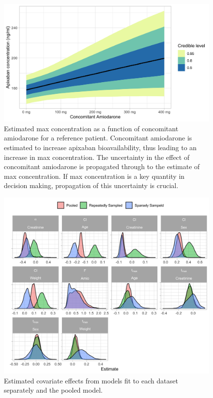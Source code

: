 \begin{figure}
	
	{\centering \includegraphics[width=\linewidth]{figures/max-concentration-1} 
		
	}
	
	\caption{Estimated max concentration as a function of concomitant amiodarone for a reference patient.  Concomitant amiodarone is estimated to increase apixaban bioavailability, thus leading to an increase in max concentration. The uncertainty in the effect of concomitant amiodarone is propagated through to the estimate of max concentration.  If max concentration is a key quantity in decision making, propagation of this uncertainty is crucial.}\label{fig:max-concentration}
\end{figure}

\begin{figure}
	
	{\centering \includegraphics[width=\linewidth]{figures/effect-estimates-1} 
		
	}
	
	\caption{Estimated covariate effects from models fit to each dataset separately and the pooled model.}\label{fig:effect-estimates}
\end{figure}
